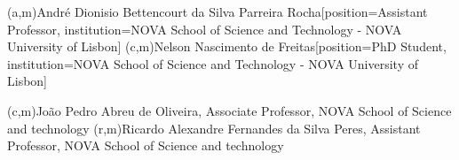 %
%
%
%
(a,m){André Dionisio Bettencourt da Silva Parreira Rocha}[position=Assistant Professor, institution=NOVA School of Science and Technology - NOVA University of Lisbon]
(c,m){Nelson Nascimento de Freitas}[position=PhD Student, institution=NOVA School of Science and Technology - NOVA University of Lisbon]

%
%
%
%
(c,m){João Pedro Abreu de Oliveira, Associate Professor, NOVA School of Science and technology}
(r,m){Ricardo Alexandre Fernandes da Silva Peres, Assistant Professor, NOVA School of Science and technology}
